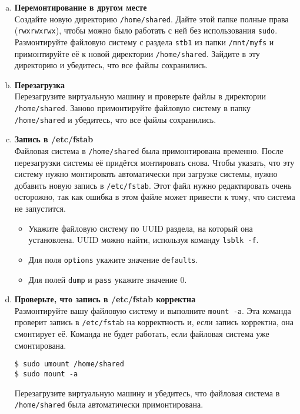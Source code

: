 \documentclass{article}
\begin{document}
\begin{enumerate}[a.]
\item \textbf{Перемонтирование в другом месте}\\
Создайте новую директорию \texttt{/home/shared}. Дайте этой папке полные права (\texttt{rwxrwxrwx}), чтобы можно было работать с ней без использования \texttt{sudo}.  Размонтируйте файловую систему с раздела \texttt{stb1} из папки \texttt{/mnt/myfs} и примонтируйте её к новой директории \texttt{/home/shared}. Зайдите в эту директорию и убедитесь, что все файлы сохранились. 

\item \textbf{Перезагрузка}\\
Перезагрузите виртуальную машину и проверьте файлы в директории \texttt{/home/shared}.
Заново примонтируйте файловую систему в папку \texttt{/home/shared} и убедитесь, что все файлы сохранились.

\item \textbf{Запись в /etc/fstab}\\
Файловая система в \texttt{/home/shared} была примонтирована временно. После перезагрузки системы её придётся монтировать снова. Чтобы указать, что эту систему нужно монтировать автоматически при загрузке системы, нужно добавить новую запись в \texttt{/etc/fstab}. Этот файл нужно редактировать очень осторожно, так как ошибка в этом файле может привести к тому, что система не запустится.
\begin{itemize}
\item Укажите файловую систему по UUID раздела, на который она установлена. UUID можно найти, используя команду \texttt{lsblk -f}.
\item Для поля \texttt{options} укажите значение \texttt{defaults}.
\item Для полей \texttt{dump} и \texttt{pass} укажите значение 0.
\end{itemize}

\item \textbf{Проверьте, что запись в /etc/fstab корректна}\\
Размонтируйте вашу файловую систему и выполните \texttt{mount -a}. Эта команда проверит запись в \texttt{/etc/fstab} на корректность и, если запись корректна, она смонтирует её. Команда не будет работать, если файловая система уже смонтирована.
\begin{lstlisting}
$ sudo umount /home/shared
$ sudo mount -a
\end{lstlisting}
Перезагрузите виртуальную машину и убедитесь, что файловая система в \texttt{/home/shared} была автоматически примонтирована.

\end{enumerate}
\end{document}
